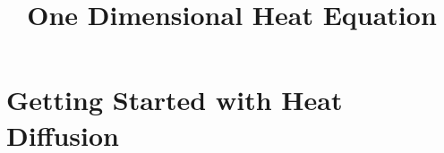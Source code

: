 \documentclass{manual}
\title{One Dimensional Heat Equation}
\begin{document}
\chapter{Getting Started with Heat Diffusion}




\end{document}
